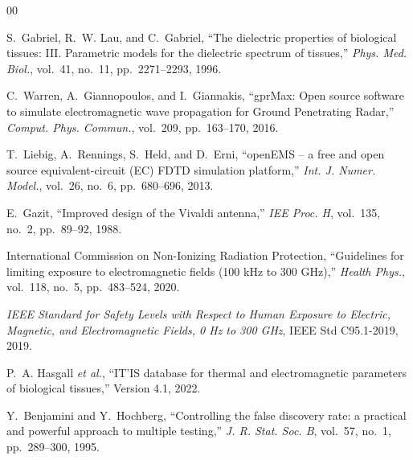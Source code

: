 \documentclass[conference]{IEEEtran}
\begin{document}
\begin{thebibliography}{00}

S.~Gabriel, R.~W. Lau, and C.~Gabriel, ``The dielectric properties of
biological tissues: III. Parametric models for the dielectric spectrum of
tissues,'' \emph{Phys. Med. Biol.}, vol.~41, no.~11, pp.~2271--2293, 1996.

C.~Warren, A.~Giannopoulos, and I.~Giannakis, ``gprMax: Open source software
to simulate electromagnetic wave propagation for Ground Penetrating Radar,''
\emph{Comput. Phys. Commun.}, vol.~209, pp.~163--170, 2016.

T.~Liebig, A.~Rennings, S.~Held, and D.~Erni, ``openEMS -- a free and open
source equivalent-circuit (EC) FDTD simulation platform,'' \emph{Int. J.
Numer. Model.}, vol.~26, no.~6, pp.~680--696, 2013.

E.~Gazit, ``Improved design of the Vivaldi antenna,'' \emph{IEE Proc. H},
vol.~135, no.~2, pp.~89--92, 1988.

International Commission on Non-Ionizing Radiation Protection, ``Guidelines
for limiting exposure to electromagnetic fields (100 kHz to 300 GHz),''
\emph{Health Phys.}, vol.~118, no.~5, pp.~483--524, 2020.

\emph{IEEE Standard for Safety Levels with Respect to Human Exposure to
Electric, Magnetic, and Electromagnetic Fields, 0 Hz to 300 GHz}, IEEE Std
C95.1-2019, 2019.

P.~A. Hasgall \emph{et al.}, ``IT'IS database for thermal and
electromagnetic parameters of biological tissues,'' Version 4.1, 2022.

Y.~Benjamini and Y.~Hochberg, ``Controlling the false discovery rate: a
practical and powerful approach to multiple testing,'' \emph{J. R. Stat.
Soc. B}, vol.~57, no.~1, pp.~289--300, 1995.

\end{thebibliography}
\end{document}
